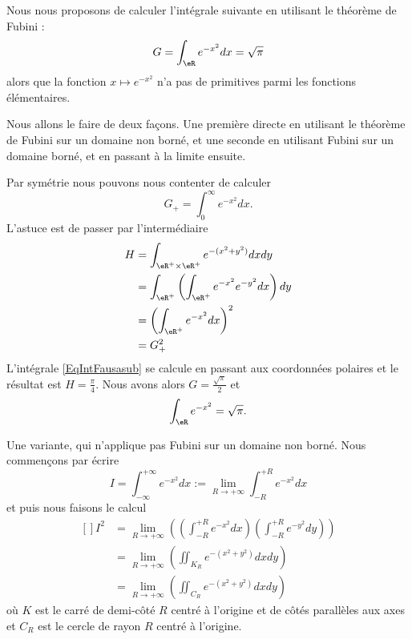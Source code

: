 \begin{example}  \label{EXooLUFAooGcxFUW}
	Nous nous proposons de calculer l'intégrale suivante en utilisant le théorème de Fubini :
	\begin{equation}
		G=\int_{\eR} e^{-x^2}dx=\sqrt{ \pi }
	\end{equation}
	alors que la fonction \( x\mapsto  e^{-x^2}\) n'a pas de primitives parmi les fonctions élémentaires.

	Nous allons le faire de deux façons. Une première directe en utilisant le théorème de Fubini sur un domaine non borné, et une seconde en utilisant Fubini sur un domaine borné, et en passant à la limite ensuite.

	\begin{subproof}

		Par symétrie nous pouvons nous contenter de calculer
		\begin{equation}
			G_+=\int_0^{\infty} e^{-x^2}dx.
		\end{equation}
		L'astuce est de passer par l'intermédiaire
		\begin{subequations}
			\begin{align}
				H & =\int_{\eR^+\times\eR^+} e^{-(x^2+y^2)}dxdy       \label{EqIntFausasub} \\
				  & =\int_{\eR^+}\left( \int_{\eR^+} e^{-x^2} e^{-y^2}dx \right)dy          \\
				  & =\left( \int_{\eR^+} e^{-x^2} dx\right)^2                               \\
				  & =G_+^2
			\end{align}
		\end{subequations}
		L'intégrale \eqref{EqIntFausasub} se calcule en passant aux coordonnées polaires et le résultat est \( H=\frac{ \pi }{ 4 }\). Nous avons alors \( G=\frac{ \sqrt{\pi} }{ 2 }\) et
		\begin{equation}
			\int_{\eR} e^{-x^2}=\sqrt{\pi}.
		\end{equation}

		Une variante, qui n'applique pas Fubini sur un domaine non borné. Nous commençons par écrire
		\begin{equation}
			I=\int_{-\infty}^{+\infty} e^{-x^2} dx := \lim_{R \to +\infty} \int_{-R}^{+R} e^{-x^2} dx
		\end{equation}
		et puis nous faisons le calcul
		\begin{equation}		\label{EqCalculInteeemoisxcar}
			\begin{aligned}[]
				I^2 & = \lim_{R \to +\infty} \left( (\int_{-R}^{+R} e^{-x^2} dx)( \int_{-R}^{+R} e^{-y^2} dy) \right) \\
				    & = \lim_{R \to +\infty} \left( \iint_{K_R}e^{-(x^2+y^2)} dx dy \right)                           \\
				    & = \lim_{R \to +\infty} \left( \iint_{C_R}e^{-(x^2+y^2)} dx dy \right)
			\end{aligned}
		\end{equation}
		où \( K\) est le carré de demi-côté \( R\) centré à l'origine et de côtés parallèles aux axes et \( C_R\) est le cercle de rayon \( R\) centré à l'origine.


\end{subproof}
\end{example}
